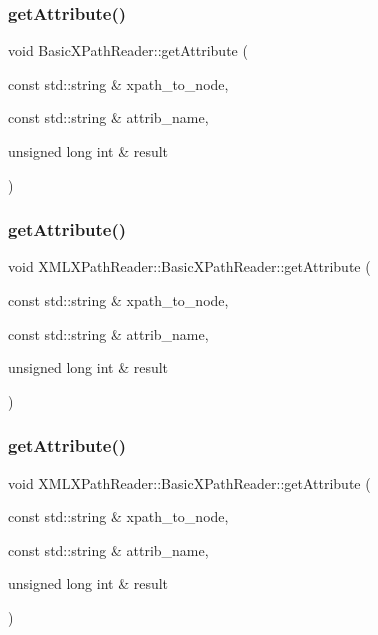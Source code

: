 \subsubsection{\texorpdfstring{getAttribute()}{getAttribute()}\hspace{0.1cm}{\footnotesize\ttfamily [19/30]}}
{\footnotesize\ttfamily void Basic\+X\+Path\+Reader\+::get\+Attribute (\begin{DoxyParamCaption}\item[{const std\+::string \&}]{xpath\+\_\+to\+\_\+node,  }\item[{const std\+::string \&}]{attrib\+\_\+name,  }\item[{unsigned long int \&}]{result }\end{DoxyParamCaption})}

\mbox{\label{classXMLXPathReader_1_1BasicXPathReader_ab4fb1448173672498fc795296d838ac9}} 
\subsubsection{\texorpdfstring{getAttribute()}{getAttribute()}\hspace{0.1cm}{\footnotesize\ttfamily [20/30]}}
{\footnotesize\ttfamily void X\+M\+L\+X\+Path\+Reader\+::\+Basic\+X\+Path\+Reader\+::get\+Attribute (\begin{DoxyParamCaption}\item[{const std\+::string \&}]{xpath\+\_\+to\+\_\+node,  }\item[{const std\+::string \&}]{attrib\+\_\+name,  }\item[{unsigned long int \&}]{result }\end{DoxyParamCaption})}

\mbox{\label{classXMLXPathReader_1_1BasicXPathReader_ab4fb1448173672498fc795296d838ac9}} 
\subsubsection{\texorpdfstring{getAttribute()}{getAttribute()}\hspace{0.1cm}{\footnotesize\ttfamily [21/30]}}
{\footnotesize\ttfamily void X\+M\+L\+X\+Path\+Reader\+::\+Basic\+X\+Path\+Reader\+::get\+Attribute (\begin{DoxyParamCaption}\item[{const std\+::string \&}]{xpath\+\_\+to\+\_\+node,  }\item[{const std\+::string \&}]{attrib\+\_\+name,  }\item[{unsigned long int \&}]{result }\end{DoxyParamCaption})}

